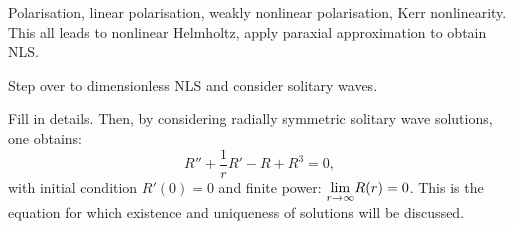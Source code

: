 \seperate

Polarisation, linear polarisation, weakly nonlinear polarisation, Kerr nonlinearity.
This all leads to nonlinear Helmholtz, apply paraxial approximation to obtain NLS.

\seperate

Step over to dimensionless NLS and consider solitary waves.

\seperate

{\color{red} Fill in details.} Then, by considering radially symmetric solitary wave solutions, one obtains:
$$ R'' + \frac{1}{r}R' - R + R^3 = 0, $$
with initial condition $R'(0)=0$ and finite {\color{red}power}: $\underset{r\to\infty}{\lim} R(r) = 0$.
This is the equation for which existence and uniqueness of solutions will be discussed.

\seperate

